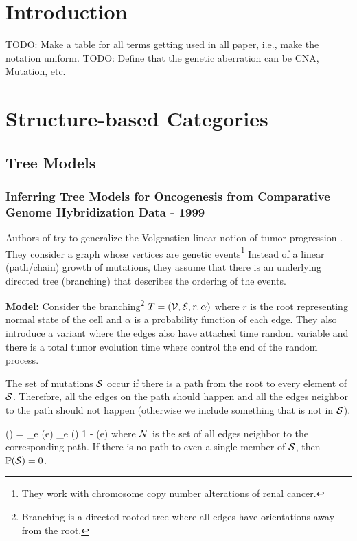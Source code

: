 \section{Introduction}
	TODO: Make a table for all terms getting used in all paper, i.e., make the notation uniform. 
	TODO: Define that the genetic aberration can be CNA, Mutation, etc. 
	
	\section{Structure-based Categories}
	
	\subsection{Tree Models}
	\subsubsection{Inferring Tree Models for Oncogenesis from Comparative Genome Hybridization Data \cite{desper99} - 1999}
	\label{oncotree}
	Authors of \cite{desper99} try to generalize the Volgenstien linear notion of tumor progression \cite{fearon90}. 
	They consider a graph whose vertices are genetic events\footnote{They work with chromosome copy number alterations of renal cancer.} 
	Instead of a linear (path/chain) growth of mutations, they assume that there is an underlying directed tree (branching) that describes the ordering of the events. 
	
	{\bf Model:}
	Consider the branching\footnote{Branching is a directed rooted tree where all edges have orientations away from the root.} $T = ({\cal V}, {\cal E}, r, \alpha)$ where $r$ is the root representing normal state of the cell and $\alpha$ is a probability function of each edge. 
	They also introduce a variant where the edges also have attached time random variable and there is a total tumor evolution time where control the end of the random process. 
	
	The set of mutations ${\cal S}$ occur if there is a path from the root to every element of ${\cal S}$. 
	Therefore, all the edges on the path should happen and all the edges neighbor to the path should not happen (otherwise we include something that is not in ${\cal S}$). 
	
	\be 
	\pr (\cS) = \prod_{e \in \cS} \alpha(e) \prod_{e \in \cN(\cS)\setminus \cS} 1 - \alpha(e)
	\ee 
	where ${\cal N}$ is the set of all edges neighbor to the corresponding path. 	
	If there is no path to even a single member of ${\cal S}$, then $\mathbb{P}({\cal S}) = 0$.
	
